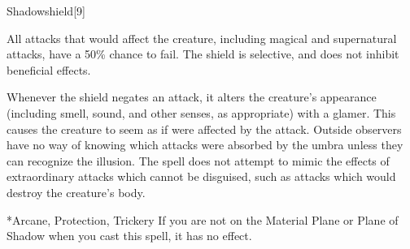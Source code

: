 \begin{spellsection}{Shadowshield}[9]
    \begin{spellheader}
    \end{spellheader}
    \begin{spellcontent}
        \begin{spelltargetinginfo}
        \end{spelltargetinginfo}
        \begin{spelleffects}
            \spelleffect All attacks that would affect the creature, including magical and supernatural attacks, have a 50\% chance to fail. The shield is selective, and does not inhibit beneficial effects.

            Whenever the shield negates an attack, it alters the creature's appearance (including smell, sound, and other senses, as appropriate) with a glamer. This causes the creature to seem as if were affected by the attack. Outside observers have no way of knowing which attacks were absorbed by the umbra unless they can recognize the illusion. The spell does not attempt to mimic the effects of extraordinary attacks which cannot be disguised, such as attacks which would destroy the creature's body.
            \spelldur \durshort
        \end{spelleffects}
    \end{spellcontent}
    \begin{spellfooter}
        *{Arcane, Protection, Trickery}
        \spellnotes If you are not on the Material Plane or Plane of Shadow when you cast this spell, it has no effect.
        \miscastrandom
    \end{spellfooter}
\end{spellsection}


